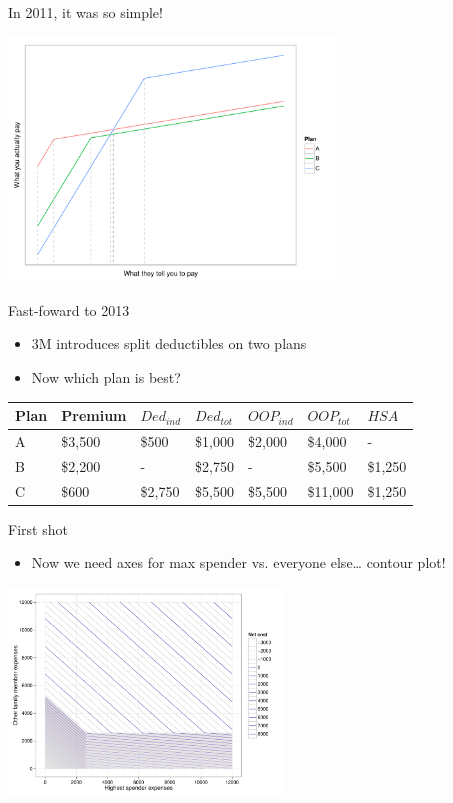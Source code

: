\documentclass[sans,aspectratio=169,presentation,bigger,fleqn]{beamer}
\begin{document}
\begin{frame}[label=sec-18]{In 2011, it was so simple!}
\begin{center}
\includegraphics[height=6.5cm]{./img/ins-intersections.pdf}
\end{center}
\end{frame}

\begin{frame}[label=sec-19]{Fast-foward to 2013}
\begin{itemize}
\item 3M introduces split deductibles on two plans
\item Now which plan is best?
\end{itemize}

\footnotesize
\begin{center}
\begin{tabular}{lllllll}
\toprule
Plan & Premium & \(Ded_{ind}\) & \(Ded_{tot}\) & \(OOP_{ind}\) & \(OOP_{tot}\) & \(HSA\)\\
\midrule
A & \$3,500 & \$500 & \$1,000 & \$2,000 & \$4,000 & -\\
B & \$2,200 & - & \$2,750 & - & \$5,500 & \$1,250\\
C & \$600 & \$2,750 & \$5,500 & \$5,500 & \$11,000 & \$1,250\\
\bottomrule
\end{tabular}
\end{center}
\normalsize
\end{frame}

\begin{frame}[label=sec-20]{First shot}
\begin{itemize}
\item Now we need axes for max spender vs. everyone else\ldots{} contour plot!
\end{itemize}

\begin{center}
\includegraphics[height=5.5cm]{./img/ins-contour.pdf}
\end{center}
\end{frame}
\end{document}
